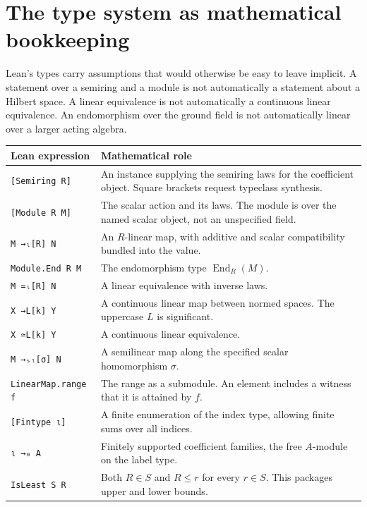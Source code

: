 \documentclass[11pt,a4paper]{article}
\newcommand{\code}[1]{\nolinkurl{#1}}
\begin{document}


\section{The type system as mathematical bookkeeping}\label{sec:types}

Lean's types carry assumptions that would otherwise be easy to leave implicit. A statement over a semiring and a module is not automatically a statement about a Hilbert space. A linear equivalence is not automatically a continuous linear equivalence. An endomorphism over the ground field is not automatically linear over a larger acting algebra.

\begin{longtable}{p{}p{}}
\toprule Lean expression & Mathematical role \\\midrule\endhead
\code{[Semiring R]} & An instance supplying the semiring laws for the coefficient object. Square brackets request typeclass synthesis. \\
\code{[Module R M]} & The scalar action and its laws. The module is over the named scalar object, not an unspecified field. \\
\code{M →ₗ[R] N} & An $R$-linear map, with additive and scalar compatibility bundled into the value. \\
\code{Module.End R M} & The endomorphism type $\operatorname{End}_R(M)$. \\
\code{M ≃ₗ[R] N} & A linear equivalence with inverse laws. \\
\code{X →L[k] Y} & A continuous linear map between normed spaces. The uppercase $L$ is significant. \\
\code{X ≃L[k] Y} & A continuous linear equivalence. \\
\code{M →ₛₗ[σ] N} & A semilinear map along the specified scalar homomorphism $\sigma$. \\
\code{LinearMap.range f} & The range as a submodule. An element includes a witness that it is attained by $f$. \\
\code{[Fintype ι]} & A finite enumeration of the index type, allowing finite sums over all indices. \\
\code{ι →₀ A} & Finitely supported coefficient families, the free $A$-module on the label type. \\
\code{IsLeast S R} & Both $R\in S$ and $R\leq r$ for every $r\in S$. This packages upper and lower bounds. \\
\bottomrule
\end{longtable}
\end{document}
